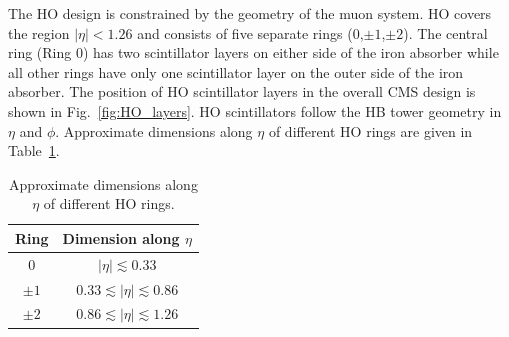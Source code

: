 \documentclass{cmspaper}
\begin{document}
The HO design is constrained by the geometry of the muon system. HO covers the region $|\eta|<1.26$ and consists of five separate rings ($0$,$\pm 1$,$\pm 2$). The central ring (Ring $0$) has two scintillator layers on either side of the iron absorber while all other rings have only one scintillator layer on the outer side of the iron absorber. The position of HO scintillator layers in the overall CMS design is shown in Fig.~\ref{fig:HO_layers}. HO scintillators follow the HB tower geometry in $\eta$ and $\phi$. Approximate dimensions along $\eta$ of different HO rings are given in Table~\ref{tab:ring_dim}.
\begin{table}[h]
 \caption{Approximate dimensions along $\eta$ of different HO rings.}
 \centering
 \begin{tabular}{c|c}
  Ring    & Dimension along $\eta$ \\ \hline \hline
  $0$     & $|\eta|\lesssim0.33$ \\ \hline
  $\pm 1$ & $0.33\lesssim|\eta|\lesssim 0.86$ \\ \hline
  $\pm 2$ & $0.86\lesssim|\eta|\lesssim 1.26$
 \end{tabular}
 \label{tab:ring_dim}
\end{table}
\end{document}
